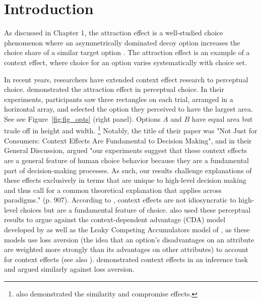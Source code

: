 \section{Introduction}

As discussed in Chapter 1, the attraction effect is a well-studied choice phenomenon where an asymmetrically dominated decoy option increases the choice share of a similar target option \parencite{huberAddingAsymmetricallyDominated1982d}. The attraction effect is an example of a context effect, where choice for an option varies systematically with choice set.

In recent years, researchers have extended context effect research to perceptual choice. \textcite{trueblood2013not} demonstrated the attraction effect in perceptual choice. In their experiments, participants saw three rectangles on each trial, arranged in a horizontal array, and selected the option they perceived to have the largest area. See see Figure~\ref{fig:fig_opts} (right panel).  Options $A$ and $B$ have equal area but trade off in height and width. \footnote{\textcite{trueblood2013not} also demonstrated the similarity and compromise effects.} Notably, the title of their paper was "Not Just for Consumers: Context Effects Are Fundamental to Decision Making", and in their General Discussion, \textcite{trueblood2013not} argued "our experiments suggest that these context effects are a general feature of human choice behavior because they are a fundamental part of decision-making processes. As such, our results challenge explanations of these effects exclusively in terms that are unique to high-level decision making and thus call for a common theoretical explanation that applies across paradigms." (p. 907). According to \textcite{trueblood2013not}, context effects are not idiosyncratic to high-level choices but are a fundamental feature of choice. \textcite{trueblood2013not} also used these perceptual results to argue against the context-dependent advantage (CDA) model developed by \textcite{tversky1993context} as well as the Leaky Competing Accumulators model of \textcite{usherLossAversionInhibition2004a}, as these models use loss aversion (the idea that an option's disadvantages on an attribute are weighted more strongly than its advantages on other attributes) to account for context effects (see also \textcite{truebloodPhantomDecoyEffect2017c}). \textcite{truebloodMultialternativeContextEffects2012} demonstrated context effects in an inference task and argued similarly against loss aversion.

